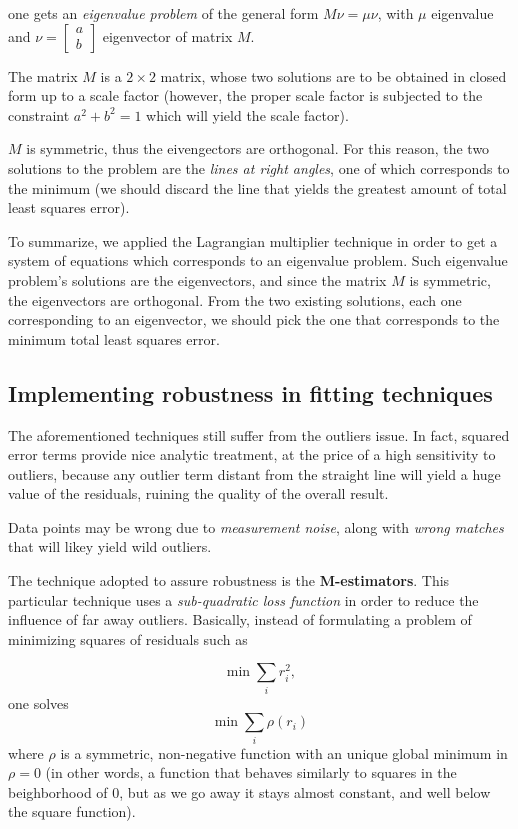 \documentclass[10pt]{report}
\begin{document}
one gets an \emph{eigenvalue problem} of the general form \(M\nu = \mu \nu\),
with \(\mu\) eigenvalue and \(\nu = \begin{bmatrix}a\\ b\end{bmatrix}\)
eigenvector of matrix \(M\).

The matrix \(M\) is a \(2 \times 2\) matrix, whose two solutions are to
be obtained in closed form up to a scale factor (however, the proper
scale factor is subjected to the constraint \(a^2 + b^2 = 1\) which will
yield the scale factor).

\(M\) is symmetric, thus the eivengectors are orthogonal. For this
reason, the two solutions to the problem are the \emph{lines at right
angles}, one of which corresponds to the minimum (we should discard the
line that yields the greatest amount of total least squares error).

To summarize, we applied the Lagrangian multiplier technique in order to
get a system of equations which corresponds to an eigenvalue problem.
Such eigenvalue problem's solutions are the eigenvectors, and since the
matrix \(M\) is symmetric, the eigenvectors are orthogonal. From the two
existing solutions, each one corresponding to an eigenvector, we should
pick the one that corresponds to the minimum total least squares error.

\subsection{Implementing robustness in fitting techniques}
\label{sec:org13dd6ce}
The aforementioned techniques still suffer from the outliers issue. In
fact, squared error terms provide nice analytic treatment, at the price
of a high sensitivity to outliers, because any outlier term distant from
the straight line will yield a huge value of the residuals, ruining the
quality of the overall result.

Data points may be wrong due to \emph{measurement noise}, along with \emph{wrong
matches} that will likey yield wild outliers.

The technique adopted to assure robustness is the \textbf{M-estimators}. This
particular technique uses a \emph{sub-quadratic loss function} in order to
reduce the influence of far away outliers. Basically, instead of
formulating a problem of minimizing squares of residuals such as

\[\min \sum_i r_i^2,\] one solves \[\min \sum_i \rho(r_i)\] where
\(\rho\) is a symmetric, non-negative function with an unique global
minimum in \(\rho=0\) (in other words, a function that behaves similarly
to squares in the beighborhood of \(0\), but as we go away it stays
almost constant, and well below the square function).
\end{document}
